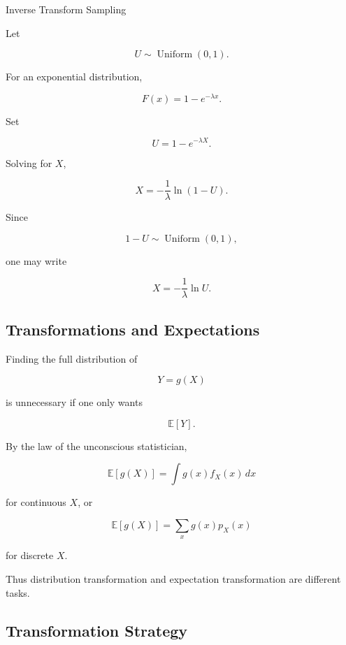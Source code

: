 \begin{workedexamplebox}{Inverse Transform Sampling}

Let

\[
U\sim\operatorname{Uniform}(0,1).
\]

For an exponential distribution,

\[
F(x)
=
1-e^{-\lambda x}.
\]

Set

\[
U
=
1-e^{-\lambda X}.
\]

Solving for \(X\),

\[
X
=
-\frac1\lambda
\ln(1-U).
\]

Since

\[
1-U
\sim
\operatorname{Uniform}(0,1),
\]

one may write

\begin{answerbox}
\[
\boxed{
X
=
-\frac1\lambda
\ln U.
}
\]
\end{answerbox}

\end{workedexamplebox}

\subsection{Transformations and Expectations}
\label{subsec:transformations-expectation}

Finding the full distribution of

\[
Y=g(X)
\]

is unnecessary if one only wants

\[
\mathbb{E}[Y].
\]

By the law of the unconscious statistician,

\[
\boxed{
\mathbb{E}[g(X)]
=
\int
g(x)f_X(x)\,dx
}
\]

for continuous \(X\), or

\[
\boxed{
\mathbb{E}[g(X)]
=
\sum_x
g(x)p_X(x)
}
\]

for discrete \(X\).

Thus distribution transformation and expectation transformation are
different tasks.

\subsection{Transformation Strategy}
\label{subsec:transformation-strategy}

